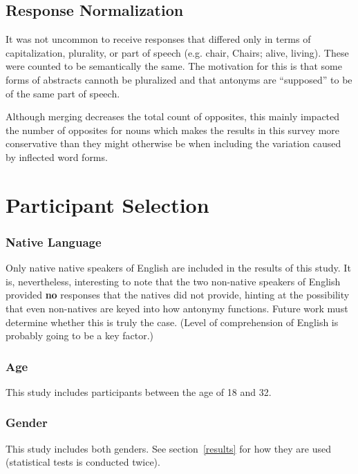 \subsection{Response Normalization} It was not uncommon to receive responses that differed only in terms of capitalization, plurality, or part of speech (e.g. chair, Chairs; alive, living).  These were counted to be semantically the same.  The motivation for this is that some forms of abstracts cannoth be pluralized and that antonyms are ``supposed'' to be of the same part of speech.

Although merging decreases the total count of opposites, this mainly impacted the number of opposites for nouns which makes the results in this survey more conservative than they might otherwise be when including the variation caused by inflected word forms.  


\section{Participant Selection}
\subsubsection{Native Language}
Only native native speakers of English are included in the results of this study. It is, nevertheless, interesting to note that the two non-native speakers of English provided \textbf{no} responses that the natives did not provide, hinting at the possibility that even non-natives are keyed into how antonymy functions.  Future work must determine whether this is truly the case. (Level of comprehension of English is probably going to be a key factor.)

\subsubsection{Age}
This study includes participants between the age of 18 and 32.

\subsubsection{Gender}
This study includes both genders.  See section~\ref{results} for how they are used (statistical tests is conducted twice).  
